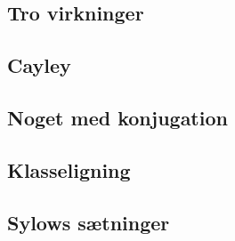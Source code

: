 \documentclass[11pt]{article}
\begin{document}
\subsection*{Tro virkninger}
\subsection*{Cayley}
\subsection*{Noget med konjugation}
\subsection*{Klasseligning}
\subsection*{Sylows sætninger}
\end{document}
